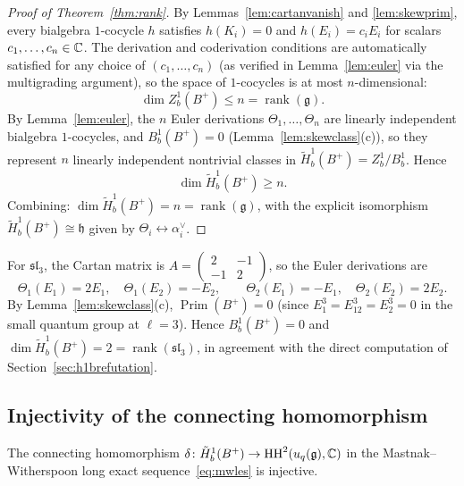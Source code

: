 \begin{proof}[Proof of Theorem~\ref{thm:rank}]
By Lemmas~\ref{lem:cartanvanish} and \ref{lem:skewprim}, every bialgebra $1$-cocycle $h$ satisfies $h(K_i) = 0$ and $h(E_i) = c_i E_i$ for scalars $c_1, \ldots, c_n \in \mathbb{C}$. The derivation and coderivation conditions are automatically satisfied for any choice of $(c_1, \ldots, c_n)$ (as verified in Lemma~\ref{lem:euler} via the multigrading argument), so the space of $1$-cocycles is at most $n$-dimensional:
\[
\dim Z^1_b(B^+) \leq n = \operatorname{rank}(\mathfrak{g}).
\]
By Lemma~\ref{lem:euler}, the $n$ Euler derivations $\Theta_1, \ldots, \Theta_n$ are linearly independent bialgebra $1$-cocycles, and $B^1_b(B^+) = 0$ (Lemma~\ref{lem:skewclass}(c)), so they represent $n$ linearly independent nontrivial classes in $\tilde{H}^1_b(B^+) = Z^1_b / B^1_b$. Hence
\[
\dim \tilde{H}^1_b(B^+) \geq n.
\]
Combining: $\dim \tilde{H}^1_b(B^+) = n = \operatorname{rank}(\mathfrak{g})$, with the explicit isomorphism $\tilde{H}^1_b(B^+) \cong \mathfrak{h}$ given by $\Theta_i \leftrightarrow \alpha_i^\vee$.
\end{proof}

\begin{example}[$\mathfrak{sl}_3$ at $\ell = 3$]
For $\mathfrak{sl}_3$, the Cartan matrix is $A = \begin{pmatrix} 2 & -1 \\ -1 & 2 \end{pmatrix}$, so the Euler derivations are
\[
\Theta_1(E_1) = 2 E_1, \quad \Theta_1(E_2) = -E_2, \qquad \Theta_2(E_1) = -E_1, \quad \Theta_2(E_2) = 2 E_2.
\]
By Lemma~\ref{lem:skewclass}(c), $\operatorname{Prim}(B^+) = 0$ (since $E_1^3 = E_{12}^3 = E_2^3 = 0$ in the small quantum group at $\ell = 3$). Hence $B^1_b(B^+) = 0$ and $\dim \tilde{H}^1_b(B^+) = 2 = \operatorname{rank}(\mathfrak{sl}_3)$, in agreement with the direct computation of Section~\ref{sec:h1brefutation}.
\end{example}

\subsection{Injectivity of the connecting homomorphism}
\label{sec:injectivity}

\begin{proposition}
\label{prop:injectivity}
The connecting homomorphism $\delta \colon \tilde{H}^1_b(B^+) \to \operatorname{HH}^2(u_q(\mathfrak{g}), \mathbb{C})$ in the Mastnak--Witherspoon long exact sequence~\eqref{eq:mwles} is injective.
\end{proposition}

